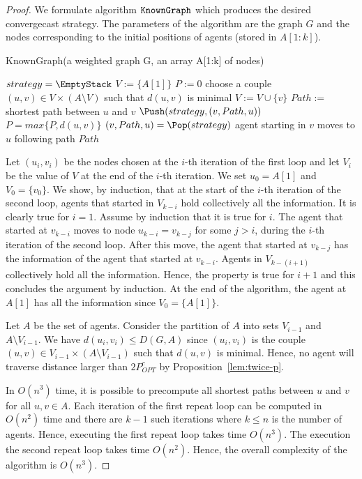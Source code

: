 \documentclass{article}
\newcommand\STree{\mbox{{\tt KnownGraph}}\xspace}
\begin{document}
\begin{proof}
We formulate algorithm $\STree$ which produces the desired convergecast strategy.
The parameters of the algorithm are the graph $G$ and the nodes corresponding to the initial positions of agents (stored in $A[1:k]$). 

\medskip

\begin{algorithm}[H]
\caption{KnownGraph(a weighted graph G, an array A{[1:k]} of nodes) \label{algo:graph}}
  
$strategy=\EmptyStack$\;
$V:=\{A[1]\}$\;
$P:=0$\;
{
	choose a couple $(u,v)\in V\times(A\setminus V)$ such that $d(u,v)$ is minimal\;
	$V:=V\cup \{v\}$\;
	$Path:=$ shortest path between $u$ and $v$\;
	$\Push(strategy,(v,Path,u))$\;
	$P=max\{P,d(u,v)\}$\;
}
{
	$(v,Path,u)=\Pop(strategy)$\;
	agent starting in $v$ moves to $u$ following path $Path$\;
}
\end{algorithm}


\medskip
Let $(u_i,v_i)$ be the nodes chosen at the $i$-th iteration of the first loop and let $V_i$ be the value of $V$ at the end of the $i$-th iteration. We set $u_0=A[1]$ and $V_0=\{v_0\}$. We show, by induction, that at the start of the $i$-th iteration of the second loop, agents that started in $V_{k-i}$ hold collectively all the information. It is clearly true for $i=1$. Assume by induction that it is true for $i$. The agent that started at $v_{k-i}$ moves to node $u_{k-i}=v_{k-j}$ for some $j>i$, during the $i$-th iteration of the second loop. After this move, the agent that started at $v_{k-j}$ has the information of the agent that started at $v_{k-i}$. Agents in $V_{k-(i+1)}$ collectively hold all the information. Hence, the property is true for $i+1$ and this concludes the argument by induction. At the end of the algorithm, the agent at $A[1]$ has all the information since $V_0=\{A[1]\}$.

Let $A$ be the set of agents. Consider the partition of $A$ into sets $V_{i-1}$ and $A\setminus V_{i-1}$. We have $d(u_i,v_i)\leq D(G,A)$ since $(u_i,v_i)$ is the couple 
$(u,v)\in V_{i-1}\times(A\setminus V_{i-1})$ such that $d(u,v)$ is minimal. Hence, no agent will traverse distance larger than $2P_{OPT}^c$ by Proposition~\ref{lem:twice-p}.

In $O(n^3)$ time, it is possible to precompute all shortest paths between $u$ and $v$ for all $u,v \in A$. Each iteration of the first repeat loop can be computed in $O(n^2)$ time and there are $k-1$ such iterations where $k\leq n$ is the number of agents. Hence, executing the first repeat loop takes time $O(n^3)$. The execution the second repeat loop takes time $O(n^2)$. Hence, the overall complexity of the algorithm is $O(n^3)$.
\end{proof}
\end{document}
